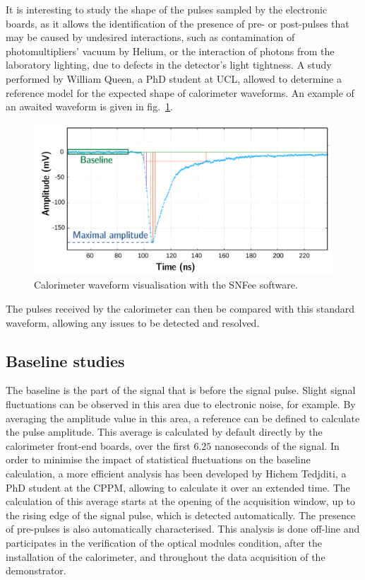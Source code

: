 It is interesting to study the shape of the pulses sampled by the electronic boards, as it allows the identification of the presence of pre- or post-pulses that may be caused by undesired interactions, such as contamination of photomultipliers' vacuum by Helium, or the interaction of photons from the laboratory lighting, due to defects in the detector's light tightness.
A study performed by William Queen, a PhD student at UCL, allowed to determine a reference model for the expected shape of calorimeter waveforms.
An example of an awaited waveform is given in fig.~\ref{fig:waveform}.
\begin{figure}[h!]
  \centering
  \includegraphics[width=1\textwidth]{commissioning/fig_commissioning/waveform.pdf}
  \caption{Calorimeter waveform visualisation with the SNFee software.
    \label{fig:waveform}}
\end{figure}
The pulses received by the calorimeter can then be compared with this standard waveform, allowing any issues to be detected and resolved.



\subsection{Baseline studies}

The baseline is the part of the signal that is before the signal pulse.
Slight signal fluctuations can be observed in this area due to electronic noise, for example.
By averaging the amplitude value in this area, a reference can be defined to calculate the pulse amplitude.
This average is calculated by default directly by the calorimeter front-end boards, over the first $6.25$ nanoseconds of the signal.
In order to minimise the impact of statistical fluctuations on the baseline calculation, a more efficient analysis has been developed by Hichem Tedjditi, a PhD student at the CPPM, allowing to calculate it over an extended time.
The calculation of this average starts at the opening of the acquisition window, up to the rising edge of the signal pulse, which is detected automatically.
The presence of pre-pulses is also automatically characterised.
This analysis is done off-line and participates in the verification of the optical modules condition, after the installation of the calorimeter, and throughout the data acquisition of the demonstrator.

